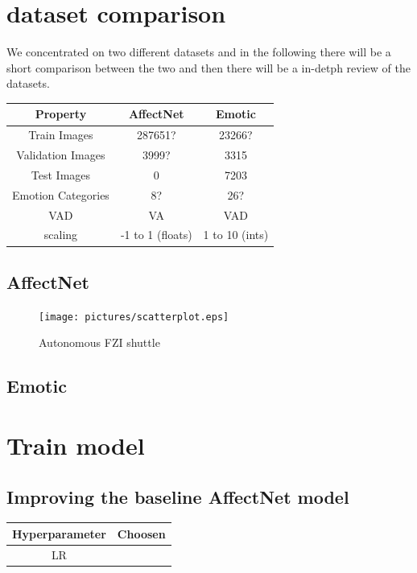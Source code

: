 \documentclass[conference]{IEEEtran}
\begin{document}
\section{dataset comparison}
We concentrated on two different datasets and in the following there will be a short comparison between the two and then there will be a in-detph review of the datasets.
\begin{center}
\begin{tabular}{ c | c c }
 Property & AffectNet & Emotic \\ 
\hline
 Train Images & 287651? & 23266? \\
 Validation Images & 3999? & 3315 \\
 Test Images & 0 & 7203 \\
 Emotion Categories & 8? & 26? \\
 VAD & VA & VAD \\
 scaling & -1 to 1 (floats) & 1 to 10 (ints) \\
\end{tabular}
\end{center}
\subsection{AffectNet}
\begin{figure}[ht]
    \centering
    \texttt{[image: pictures/scatterplot.eps]}
    \caption{Autonomous FZI shuttle}
    \label{fig:Scatterplot}
\end{figure}
\subsection{Emotic}

\newpage
\section{Train model}

\subsection{Improving the baseline AffectNet model}

\begin{center}
\begin{tabular}{c | c }
 Hyperparameter & Choosen \\ 
 \hline
 LR & \\
 \hline
\end{tabular}
\end{center}
\end{document}
